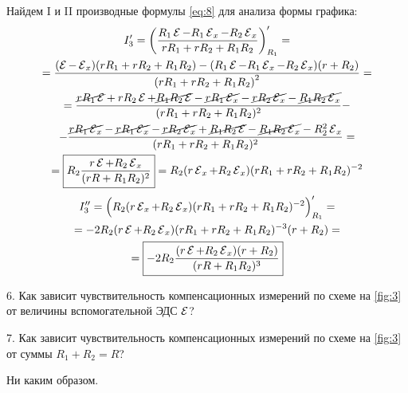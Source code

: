 Найдем I и II производные формулы \cref{eq:8} для анализа формы графика:
\begin{multline} \label{eq:4.4}
	I_3' = \left(\frac{R_1 \operatorname{\mathcal{E}} - R_1 \operatorname{\mathcal{E}}_x - R_2 \operatorname{\mathcal{E}}_x}{rR_1 + rR_2 + R_1 R_2}\right)'_{R_1} =\\= \frac{(\operatorname{\mathcal{E}} - \operatorname{\mathcal{E}}_x)(rR_1 + rR_2 + R_1 R_2) - (R_1 \operatorname{\mathcal{E}} - R_1 \operatorname{\mathcal{E}}_x - R_2 \operatorname{\mathcal{E}}_x)(r + R_2)}{\left(rR_1 + rR_2 + R_1 R_2\right)^2} = \\ = \frac{\cancel{rR_1\operatorname{\mathcal{E}}} + rR_2\operatorname{\mathcal{E}} + \cancel{R_1 R_2 \operatorname{\mathcal{E}}} - \cancel{rR_1 \operatorname{\mathcal{E}}_x} - \cancel{rR_2 \operatorname{\mathcal{E}}_x} - \cancel{R_1 R_2 \operatorname{\mathcal{E}}_x}}{(rR_1 + rR_2 + R_1 R_2)^2} -\\- \frac{\cancel{rR_1 \operatorname{\mathcal{E}}_x} - \cancel{rR_1\operatorname{\mathcal{E}}_x} - \cancel{rR_2\operatorname{\mathcal{E}}_x} + \cancel{R_1 R_2 \operatorname{\mathcal{E}}} - \cancel{R_1 R_2 \operatorname{\mathcal{E}}_x} - R_2^2 \operatorname{\mathcal{E}}_x}{(rR_1 + rR_2 + R_1 R_2)^2} = \\ = \boxed{R_2\frac{r \operatorname{\mathcal{E}} + R_2 \operatorname{\mathcal{E}}_x}{(rR + R_1 R_2)^2}} = R_2 (r\operatorname{\mathcal{E}}_x + R_2 \operatorname{\mathcal{E}}_x) (rR_1 + rR_2 + R_1 R_2) ^{-2}
\end{multline}
\begin{multline} \label{eq:4.5}
	I_3'' = \Big(R_2 (r\operatorname{\mathcal{E}}_x + R_2 \operatorname{\mathcal{E}}_x) (rR_1 + rR_2 + R_1 R_2) ^{-2}\Big)'_{R_1} = \\ = -2 R_2 (r\operatorname{\mathcal{E}} + R_2 \operatorname{\mathcal{E}}_x) (r R_1 + r R_2 + R_1 R_2)^{-3} (r+R_2) =\\= \boxed{-2R_2 \frac{(r \operatorname{\mathcal{E}} + R_2 \operatorname{\mathcal{E}}_x)(r + R_2)}{(rR + R_1 R_2)^3}}
\end{multline}




\begin{librarybox}
	6. Как зависит чувствительность компенсационных измерений по схеме на \cref{fig:3} от величины вспомогательной ЭДС $\operatorname{\mathcal{E}}$?
\end{librarybox}


\begin{librarybox}
	7. Как зависит чувствительность компенсационных измерений по схеме на \cref{fig:3} от суммы $R_1 + R_2 = R$?
\end{librarybox}
Ни каким образом.
